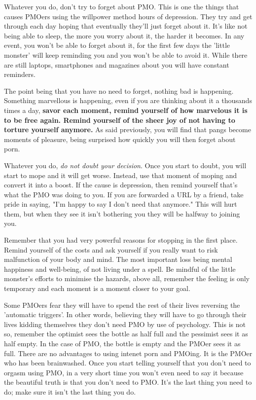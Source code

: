 \documentclass[easypeasy.tex]{subfiles}
\begin{document}
Whatever you do, don't try to forget about PMO. This is one the things that causes PMOers using the willpower method hours of depression. They try and get through each day hoping that eventually they'll just forget about it. It's like not being able to sleep, the more you worry about it, the harder it becomes. In any event, you won't be able to forget about it, for the first few days the 'little monster' will keep reminding you and you won't be able to avoid it. While there are still laptops, smartphones and magazines about you will have constant reminders.

The point being that you have no need to forget, nothing bad is happening. Something marvellous is happening, even if you are thinking about it a thousands times a day, \textbf{savor each moment, remind yourself of how marvelous it is to be free again. Remind yourself of the sheer joy of not having to torture yourself anymore.} As said previously, you will find that pangs become moments of pleasure, being surprised how quickly you will then forget about porn.

Whatever you do, \textit{do not doubt your decision}. Once you start to doubt, you will start to mope and it will get worse. Instead, use that moment of moping and convert it into a boost. If the cause is depression, then remind yourself that's what the PMO was doing to you. If you are forwarded a URL by a friend, take pride in saying, "I'm happy to say I don't need that anymore." This will hurt them, but when they see it isn't bothering you they will be halfway to joining you.

Remember that you had very powerful reasons for stopping in the first place. Remind yourself of the costs and ask yourself if you really want to risk malfunction of your body and mind. The most important loss being mental happiness and well-being, of not living under a spell. Be mindful of the little monster's efforts to minimise the hazards, above all, remember the feeling is only temporary and each moment is a moment closer to your goal.

Some PMOers fear they will have to spend the rest of their lives reversing the 'automatic triggers'. In other words, believing they will have to go through their lives kidding themselves they don't need PMO by use of psychology. This is not so, remember the optimist sees the bottle as half full and the pessimist sees it as half empty. In the case of PMO, the bottle is empty and the PMOer sees it as full. There are no advantages to using intenet porn and PMOing. It is the PMOer who has been brainwashed. Once you start telling yourself that you don't need to orgasm using PMO, in a very short time you won't even need to say it because the beautiful truth is that you don't need to PMO. It's the last thing you need to do; make sure it isn't the last thing you do.
\end{document}
